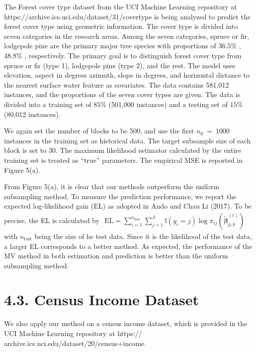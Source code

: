 \documentclass[
  10
]{article}
\begin{document}
The Forest cover type dataset from the UCI Machine Learning repository
at https://archive.ics.uci.edu/dataset/31/covertype is being analyzed to
predict the forest cover type using geometric information. The cover
type is divided into seven categories in the research areas. Among the
seven categories, spruce or fir, lodgepole pine are the primary major
tree species with proportions of \(3 6 . 5 \%\) , \(4 8 . 8 \%\) ,
respectively. The primary goal is to distinguish forest cover type from
spruce or fir (type 1), lodgepole pine (type 2), and the rest. The model
uses elevation, aspect in degrees azimuth, slope in degrees, and
horizontal distance to the nearest surface water feature as covariates.
The data contains 581,012 instances, and the proportions of the seven
cover types are given. The data is divided into a training set of
\(8 5 \%\) (501,000 instances) and a testing set of \(1 5 \%\) (80,012
instances).

We again set the number of blocks to be 500, and use the first
\(n _ { 0 } ~ = ~ 1 0 0 0\) instances in the training set as historical
data. The target subsample size of each block is set to 30. The maximum
likelihood estimator calculated by the entire training set is treated as
``true'' parameters. The empirical MSE is reported in Figure 5(a).

From Figure 5(a), it is clear that our methods outperform the uniform
subsampling method. To measure the prediction performance, we report the
expected log-likelihood gain (EL) as adopted in Ando and Chau Li (2017).
To be precise, the EL is calculated by
\(\begin{array} { r } { \mathrm { E L } = \sum _ { i = 1 } ^ { n _ { \mathrm { t e s t } } } \sum _ { j = 1 } ^ { J } \mathbb { I } ( y _ { i } = j ) \log \pi _ { i j } ( \tilde { \boldsymbol { \beta } } _ { p , k } ^ { ( t ) } ) } \end{array}\)
with \(n _ { \mathrm { t e s t } }\) being the size of he test data.
Since it is the likelihood of the test data, a larger EL corresponds to
a better method. As expected, the performance of the MV method in both
estimation and prediction is better than the uniform subsampling method.

\section{4.3. Census Income Dataset}\label{census-income-dataset}

We also apply our method on a census income dataset, which is provided
in the UCI Machine Learning repository at https://
archive.ics.uci.edu/dataset/20/census+income.
\end{document}
